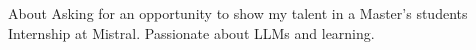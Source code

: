 \begin{rubric}{About}
\noentry{~}
Asking for an opportunity to show my talent in a Master's students Internship at Mistral. Passionate about LLMs and learning.\end{rubric}

